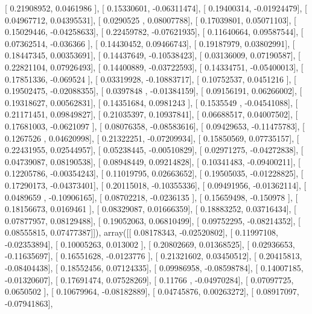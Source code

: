 \documentclass{article}
\begin{document}
       [ 0.21908952,  0.0461986 ],
       [ 0.15330601, -0.06311474],
       [ 0.19400314, -0.01924479],
       [ 0.04967712,  0.04395531],
       [ 0.0290525 ,  0.08007788],
       [ 0.17039801,  0.05071103],
       [ 0.15029446, -0.04258633],
       [ 0.22459782, -0.07621935],
       [ 0.11640664,  0.09587544],
       [ 0.07362514, -0.036366  ],
       [ 0.14430452,  0.09466743],
       [ 0.19187979,  0.03802991],
       [ 0.18447345,  0.00353691],
       [ 0.14437649, -0.10538423],
       [ 0.03136009,  0.07190587],
       [ 0.22821104,  0.07926493],
       [ 0.14400889, -0.03722593],
       [ 0.14334751, -0.05400013],
       [ 0.17851336, -0.069524  ],
       [ 0.03319928, -0.10883717],
       [ 0.10752537,  0.0451216 ],
       [ 0.19502475, -0.02088355],
       [ 0.0397848 , -0.01384159],
       [ 0.09156191,  0.06266002],
       [ 0.19318627,  0.00562831],
       [ 0.14351684,  0.0981243 ],
       [ 0.1535549 , -0.04541088],
       [ 0.21171451,  0.09849827],
       [ 0.21035397,  0.10937841],
       [ 0.06688517,  0.04007502],
       [ 0.17681003, -0.0621097 ],
       [ 0.08076358, -0.08583616],
       [ 0.09429653, -0.11475783],
       [ 0.1267526 ,  0.04620998],
       [ 0.21322251, -0.07209934],
       [ 0.15850569,  0.07735157],
       [ 0.22431955,  0.02544957],
       [ 0.05238445, -0.00510829],
       [ 0.02971275, -0.04272838],
       [ 0.04739087,  0.08190538],
       [ 0.08948449,  0.09214828],
       [ 0.10341483, -0.09400211],
       [ 0.12205786, -0.00354243],
       [ 0.11019795,  0.02663652],
       [ 0.19505035, -0.01228825],
       [ 0.17290173, -0.04373401],
       [ 0.20115018, -0.10355336],
       [ 0.09491956, -0.01362114],
       [ 0.0489659 , -0.10906165],
       [ 0.08702218, -0.0236135 ],
       [ 0.15659498, -0.150978  ],
       [ 0.18156673,  0.0169461 ],
       [ 0.08329087,  0.01666359],
       [ 0.18883252,  0.03716434],
       [ 0.07877957,  0.08129488],
       [ 0.19052063,  0.06810499],
       [ 0.09752295, -0.08214352],
       [ 0.08555815,  0.07477387]]), array([[ 0.08178343, -0.02520802],
       [ 0.11997108, -0.02353894],
       [ 0.10005263,  0.013002  ],
       [ 0.20802669,  0.01368525],
       [ 0.02936653, -0.11635697],
       [ 0.16551628, -0.0123776 ],
       [ 0.21321602,  0.03450512],
       [ 0.20415813, -0.08404438],
       [ 0.18552456,  0.07124335],
       [ 0.09986958, -0.08598784],
       [ 0.14007185, -0.01320607],
       [ 0.17691474,  0.07528269],
       [ 0.11766   , -0.04970284],
       [ 0.07097725,  0.0650502 ],
       [ 0.10679964, -0.08182889],
       [ 0.04745876,  0.00263272],
       [ 0.08917097, -0.07941863],
\end{document}
